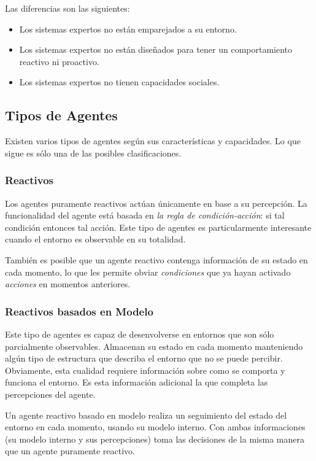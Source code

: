 Las diferencias son las siguientes:

\begin{itemize}
 \item Los sistemas expertos no están emparejados a su entorno.
 \item Los sistemas expertos no están diseñados para tener un comportamiento
 reactivo ni proactivo.
 \item Los sistemas expertos no tienen capacidades sociales.
\end{itemize}


\subsection*{Tipos de Agentes}

Existen varios tipos de agentes según sus características y capacidades. Lo que
sigue es sólo una de las posibles clasificaciones.

\subsubsection*{Reactivos}

Los agentes puramente reactivos actúan únicamente en base a su percepción. La
funcionalidad del agente está basada en {\em la regla de condición-acción}: si
tal condición entonces tal acción. Este tipo de agentes es particularmente
interesante cuando el entorno es observable en su totalidad.

También es posible que un agente reactivo contenga información de su estado en
cada momento, lo que les permite obviar {\em condiciones} que ya hayan activado
{\em acciones} en momentos anteriores.

\subsubsection*{Reactivos basados en Modelo}

Este tipo de agentes es capaz de desenvolverse en entornos que son sólo
parcialmente observables. Almacenan su estado en cada momento manteniendo algún
tipo de estructura que describa el entorno que no se puede percibir.
Obviamente, esta cualidad requiere información sobre como se comporta y
funciona el entorno. Es esta información adicional la que completa las
percepciones del agente.

Un agente reactivo basado en modelo realiza un seguimiento del estado del
entorno en cada momento, usando su modelo interno. Con ambas informaciones (su
modelo interno y sus percepciones) toma las decisiones de la misma manera que un
agente puramente reactivo.

